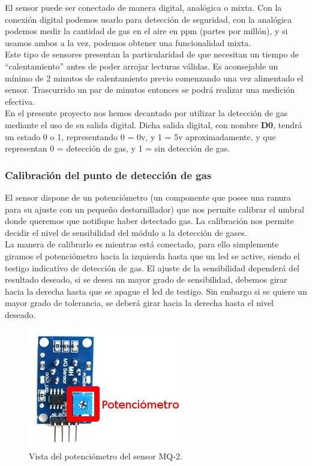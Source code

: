 El sensor puede ser conectado de manera digital, analógica o mixta. Con la conexión digital podemos usarlo para detección de seguridad, con la analógica podemos medir la cantidad 
de gas en el aire en ppm (partes por millón), y si usamos ambos a la vez, podemos obtener una funcionalidad mixta.\\

Este tipo de sensores presentan la particularidad de que necesitan un tiempo de “calentamiento” antes de poder arrojar lecturas válidas. Es aconsejable un mínimo de 2 minutos
de calentamiento previo comenzando una vez alimentado el sensor. Trascurrido un par de minutos entonces se podrá realizar una medición efectiva.\\

En el presente proyecto nos hemos decantado por utilizar la detección de gas mediante el uso de su salida digital. Dicha salida digital, con nombre \textbf{D0}, tendrá un estado
0 o 1, representando 0 = 0v, y 1 = 5v aproximadamente, y que representan 0 = detección de gas, y 1 = sin detección de gas. 

\subsubsection{ Calibración del punto de detección de gas}

El sensor dispone de un potenciómetro (un componente que posee una ranura para su ajuste con un pequeño destornillador) que nos permite calibrar el umbral donde queremos que
notifique haber detectado gas. La calibración nos permite decidir el nivel de sensibilidad del módulo a la detección de gases.\\

La manera de calibrarlo es mientras está conectado, para ello simplemente giramos el potenciómetro hacia la izquierda hasta que un led se active, siendo
el testigo indicativo de detección de gas. El ajuste de la sensibilidad dependerá del resultado deseado, si se desea un mayor grado de sensibilidad, debemos girar hacia la derecha
hasta que se apague el led de testigo. Sin embargo si se quiere un mayor grado de tolerancia, se deberá girar hacia la derecha hasta el nivel deseado.\\

\begin{figure}[H]
  \begin{center}
    \includegraphics[scale=0.6]{imagenes/mq2_trasera.jpeg}
  \end{center}
  \caption{Vista del potenciómetro del sensor MQ-2.}
  \label{figura:sensor_mq_2_potenciometro}
\end{figure}

